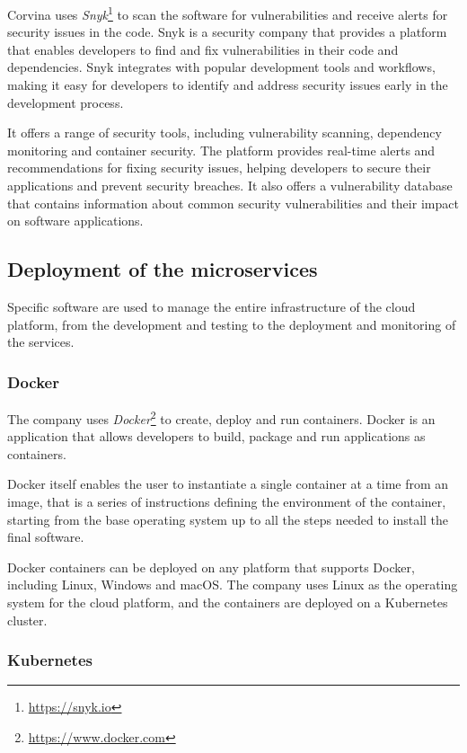 Corvina uses \textit{Snyk}\footnote{\url{https://snyk.io}} to scan the software for vulnerabilities and receive alerts for security issues in the code. Snyk is a security company that provides a platform that enables developers to find and fix vulnerabilities in their code and dependencies. Snyk integrates with popular development tools and workflows, making it easy for developers to identify and address security issues early in the development process.

It offers a range of security tools, including vulnerability scanning, dependency monitoring and container security. The platform provides real-time alerts and recommendations for fixing security issues, helping developers to secure their applications and prevent security breaches. It also offers a vulnerability database that contains information about common security vulnerabilities and their impact on software applications.

\subsection{Deployment of the microservices}

Specific software are used to manage the entire infrastructure of the cloud platform, from the development and testing to the deployment and monitoring of the services.

\subsubsection{Docker}

The company uses \textit{Docker}\footnote{\url{https://www.docker.com}} to create, deploy and run containers. Docker is an application that allows developers to build, package and run applications as containers.

Docker itself enables the user to instantiate a single container at a time from an image, that is a series of instructions defining the environment of the container, starting from the base operating system up to all the steps needed to install the final software.

Docker containers can be deployed on any platform that supports Docker, including Linux, Windows and macOS. The company uses Linux as the operating system for the cloud platform, and the containers are deployed on a Kubernetes cluster.

\subsubsection{Kubernetes}

